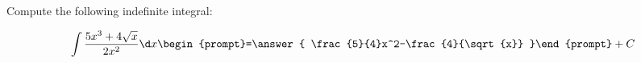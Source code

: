 \documentclass{ximera}
\author{Jim Talamo}
\begin{document}
\begin{exercise}
Compute the following indefinite integral:

\[
\int \frac{5x^3+4\sqrt{x}}{2x^2}  \d x 
\begin{prompt}=\answer{ \frac{5}{4}x^2-\frac{4}{\sqrt{x}}   }\end{prompt}+C
\]
\end{exercise}
\end{document}
